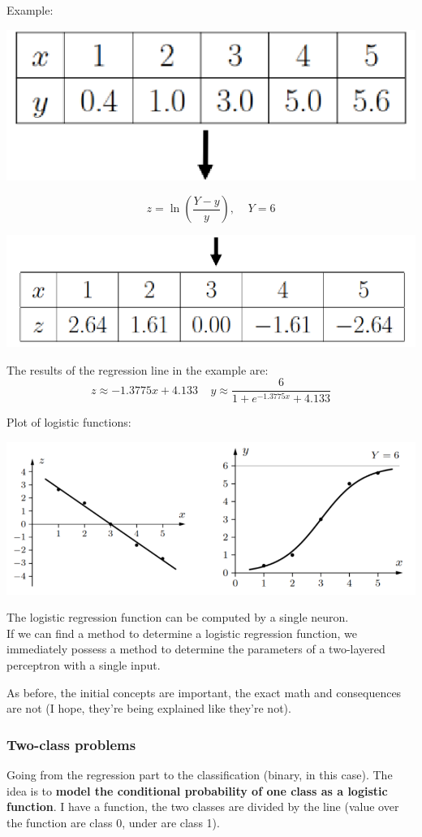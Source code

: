 \newpage

Example:
\begin{center}
	\includegraphics[width=0.4\columnwidth]{img/NN/logreg1}
\end{center}
$$ z = \ln \left(\frac{Y - y}{y}\right), \;\;\;\; Y = 6$$
\begin{center}
	\includegraphics[width=0.55\columnwidth]{img/NN/logreg2}
\end{center}
The results of the regression line in the example are:
$$ z \approx -1.3775x + 4.133 \;\;\;\; y \approx \frac{6}{1 + e^{-1.3775x} + 4.133} $$

Plot of logistic functions: 
\begin{center}
	\includegraphics[width=0.9\columnwidth]{img/NN/logreg3}
\end{center}
The logistic regression function can be computed by a single neuron.\\

If we can find a method to determine a logistic regression function, we immediately possess a method to determine the parameters of a two-layered perceptron with a single input.\\

\vfill

As before, the initial concepts are important, the exact math and consequences are not (I hope, they're being explained like they're not).

\newpage

\subsubsection{Two-class problems}
Going from the regression part to the classification (binary, in this case). The idea is to \textbf{model the conditional probability of one class as a logistic function}. I have a function, the two classes are divided by the line (value over the function are class 0, under are class 1).\\

